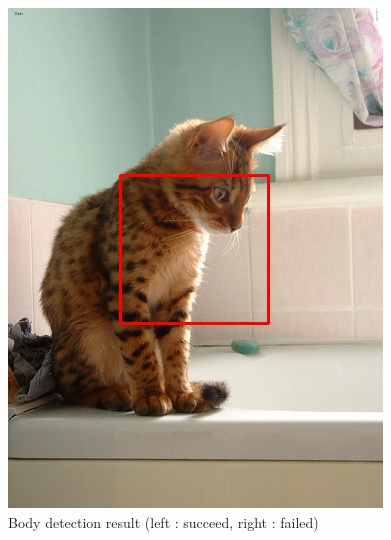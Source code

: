 \documentclass[conference,compsoc]{IEEEtran}
\begin{document}
\begin{figure}
\begin{multicols}{4}
    		\includegraphics[height=1.35\linewidth]{terrible5.jpg}\par
	\end{multicols}
	\caption{Body detection result (left : succeed, right : failed)}
\end{figure}
\end{document}
